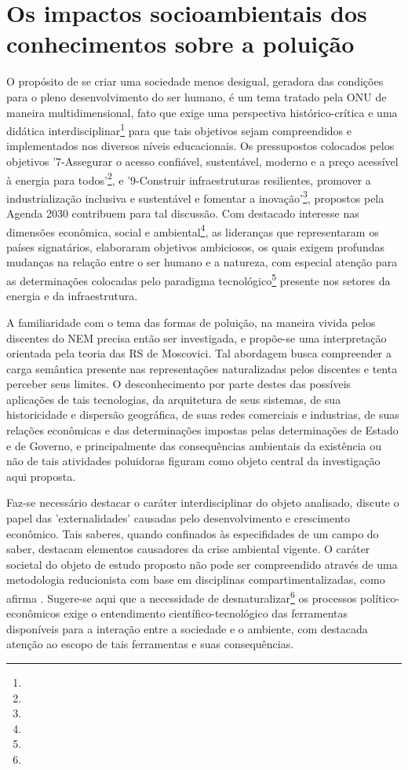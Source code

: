 \documentclass[
  12pt,       %
  openright,      %
  twoside,      %
  a4paper,      %
  english,      %
  french,       %
  spanish,      %
  brazil        %
  ]{abntex2}
\begin{document}
\section{Os impactos socioambientais dos conhecimentos sobre a poluição}

O propósito de se criar uma sociedade menos desigual, geradora das condições para o pleno desenvolvimento do ser humano, é um tema tratado pela ONU de maneira multidimensional, fato que exige uma perspectiva histórico-crítica e uma didática interdisciplinar\footnote{} para que tais objetivos sejam compreendidos e implementados nos diversos níveis educacionais. Os pressupostos colocados pelos objetivos '7-Assegurar o acesso confiável, sustentável, moderno e a preço
acessível à energia para todos'\footnote{}, e '9-Construir infraestruturas resilientes, promover a industrialização inclusiva e sustentável e fomentar a inovação'\footnote{}, propostos pela Agenda 2030 contribuem para tal discussão. Com destacado interesse nas dimensões econômica, social e ambiental\footnote{}, as lideranças que representaram os países signatários, elaboraram objetivos ambiciosos, os quais exigem profundas mudanças na relação entre o ser humano e a natureza, com especial atenção para as determinações colocadas pelo paradigma tecnológico\footnote{} presente nos setores da energia e da infraestrutura.

A familiaridade com o tema das formas de poluição, na maneira vivida pelos discentes do NEM precisa então ser investigada, e propõe-se uma interpretação orientada pela teoria das RS de Moscovici. Tal abordagem busca compreender a carga semântica presente nas representações naturalizadas pelos discentes e tenta perceber seus limites. O desconhecimento por parte destes das possíveis aplicações de tais tecnologias, da arquitetura de seus sistemas, de sua historicidade e dispersão geográfica, de suas redes comerciais e industrias, de suas relações econômicas e das determinações impostas pelas determinações de Estado e de Governo, e principalmente das consequências ambientais da existência ou não de tais atividades poluidoras figuram como objeto central da investigação aqui proposta.

Faz-se necessário destacar o caráter interdisciplinar do objeto analisado,  discute o papel das 'externalidades' causadas pelo desenvolvimento e crescimento econômico. Tais saberes, quando confinados às especifidades de um campo do saber, destacam elementos causadores da crise ambiental vigente. O caráter societal do objeto de estudo proposto não pode ser compreendido através de uma metodologia reducionista com base em disciplinas compartimentalizadas, como afirma . Sugere-se aqui que a necessidade de desnaturalizar\footnote{} os processos político-econômicos exige o entendimento científico-tecnológico das ferramentas disponíveis para a interação entre a sociedade e o ambiente, com destacada atenção ao escopo de tais ferramentas e suas consequências.
\end{document}
